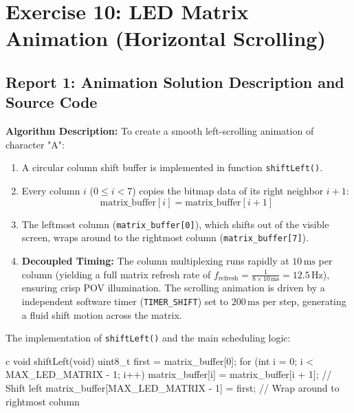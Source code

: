 \documentclass{hcmut-report}
\begin{document}
\newpage
\section{Exercise 10: LED Matrix Animation (Horizontal Scrolling)}

\subsection*{Report 1: Animation Solution Description and Source Code}
\textbf{Algorithm Description:}
To create a smooth left-scrolling animation of character "A":
\begin{enumerate}
    \item A circular column shift buffer is implemented in function \texttt{shiftLeft()}.
    \item Every column $i$ ($0 \le i < 7$) copies the bitmap data of its right neighbor $i + 1$:
    \begin{equation}
        \text{matrix\_buffer}[i] = \text{matrix\_buffer}[i+1]
    \end{equation}
    \item The leftmost column (\texttt{matrix\_buffer[0]}), which shifts out of the visible screen, wraps around to the rightmost column (\texttt{matrix\_buffer[7]}).
    \item \textbf{Decoupled Timing:} The column multiplexing runs rapidly at $10\,\text{ms}$ per column (yielding a full matrix refresh rate of $f_{\text{refresh}} = \frac{1}{8 \times 10\,\text{ms}} = 12.5\,\text{Hz}$), ensuring crisp POV illumination. The scrolling animation is driven by a independent software timer (\texttt{TIMER\_SHIFT}) set to $200\,\text{ms}$ per step, generating a fluid shift motion across the matrix.
\end{enumerate}

The implementation of \texttt{shiftLeft()} and the main scheduling logic:
\begin{code}{c}
void shiftLeft(void) {
    uint8_t first = matrix_buffer[0];
    for (int i = 0; i < MAX_LED_MATRIX - 1; i++) {
        matrix_buffer[i] = matrix_buffer[i + 1];  // Shift left
    }
    matrix_buffer[MAX_LED_MATRIX - 1] = first;    // Wrap around to rightmost column
}
\end{code}
\end{document}

